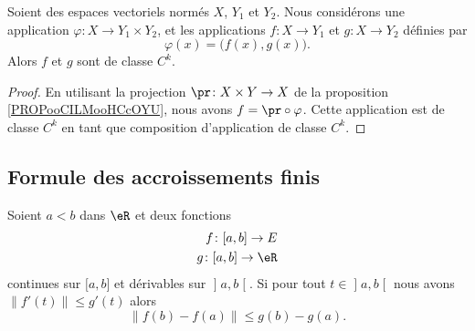 \begin{proposition}	\label{PROPooHYASooHxYIBc}
	Soient des espaces vectoriels normés \( X\), \( Y_1\) et \( Y_2\). Nous considérons une application \(\varphi \colon X\to Y_1\times Y_2  \), et les applications \(f \colon X\to Y_1    \) et \(g \colon X\to Y_2  \) définies par
	\begin{equation}
		\varphi(x)=\big( f(x), g(x) \big).
	\end{equation}
	Alors \( f\) et \( g\) sont de classe \( C^k\).
\end{proposition}

\begin{proof}
	En utilisant la projection \(\pr \colon X\times Y\to X  \) de la proposition \ref{PROPooCILMooHCcOYU}, nous avons \( f=\pr\circ\varphi\). Cette application est de classe \( C^k\) en tant que composition d'application de classe \( C^k\).
\end{proof}


\subsection{Formule des accroissements finis}

\begin{proposition} \label{PropDQLhSoy}
	Soient \( a<b\) dans \( \eR\) et deux fonctions
	\begin{subequations}
		\begin{align}
			f\colon \mathopen[ a , b \mathclose]\to E \\
			g\colon \mathopen[ a , b \mathclose]\to \eR
		\end{align}
	\end{subequations}
	continues sur \( \mathopen[ a , b \mathclose]\) et dérivables sur \( \mathopen] a , b \mathclose[\). Si pour tout \( t\in\mathopen] a , b \mathclose[\) nous avons \( \| f'(t) \|\leq g'(t)\) alors
	\begin{equation}
		\| f(b)-f(a) \|\leq g(b)-g(a).
	\end{equation}
\end{proposition}

